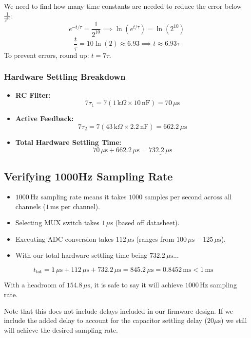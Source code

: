 \documentclass{article}
\begin{document}
\noindent We need to find how many time constants are needed to reduce the error below $\frac{1}{2^{10}}$:
\[
e^{-t/\tau} = \frac{1}{2^{10}} \implies \ln\left(e^{t/\tau}\right) = \ln\left(2^{10}\right)
\]
\[
\frac{t}{\tau} = 10 \ln(2) \approx 6.93 \implies t \approx 6.93\tau
\]
To prevent errors, round up: $t = 7\tau$.

\subsubsection*{Hardware Settling Breakdown}
\begin{itemize}
    \item \textbf{RC Filter:}
    \[
    7\tau_1 = 7(1\,\text{k}\Omega \times 10\,\text{nF}) = 70\,\mu\text{s}
    \]
    \item \textbf{Active Feedback:}
    \[
    7\tau_2 = 7(43\,\text{k}\Omega \times 2.2\,\text{nF}) = 662.2\,\mu\text{s}
    \]
    \item \textbf{Total Hardware Settling Time:}
    \[
    70\,\mu\text{s} + 662.2\,\mu\text{s} = \underline{732.2\,\mu\text{s}}
    \]
\end{itemize}

\subsection{Verifying 1000Hz Sampling Rate}

\begin{itemize}
    \item $1000\,\text{Hz}$ sampling rate means it takes $1000$ samples per second across all channels ($1\,\text{ms}$ per channel).
    \item Selecting MUX switch takes $1\,\mu\text{s}$ (based off datasheet).
    \item Executing ADC conversion takes $112\,\mu\text{s}$ (ranges from $100\,\mu\text{s} - 125\,\mu\text{s}$).
    \item With our total hardware settling time being $732.2\,\mu\text{s}$...
\end{itemize}

\[
t_{\text{tot}} = 1\,\mu\text{s} + 112\,\mu\text{s} + 732.2\,\mu\text{s} = 845.2\,\mu\text{s} = 0.8452\,\text{ms} < 1\,\text{ms} \quad
\]

\noindent With a headroom of $154.8\,\mu\text{s}$, it is safe to say it will achieve $1000\,\text{Hz}$ sampling rate.

Note that this does not include delays included in our firmware design. If we include the added delay to account for the capacitor settling delay ($20 \mu\text{s}$) we still will achieve the desired sampling rate. 
\end{document}
